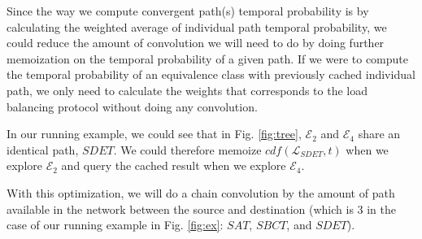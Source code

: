 Since the way we compute convergent path(s) temporal probability is by calculating the weighted average of 
individual path temporal probability, we could reduce the amount of convolution we will need to do by doing further memoization 
on the temporal probability of a given path.
If we were to compute the temporal probability of an equivalence class with previously cached individual 
path, we only need to calculate the weights that corresponds to the load balancing protocol without 
doing any convolution.

In our running example, we could see that in Fig. \ref{fig:tree}, $\mathcal{E}_2$ and $\mathcal{E}_4$ share 
an identical path, $SDET$.
We could therefore memoize $cdf(\mathcal{L}_{SDET}, t)$ when we explore $\mathcal{E}_2$ and query the 
cached result when we explore $\mathcal{E}_4$.

With this optimization, we will do a chain convolution by the amount of path available in the network between 
the source and destination (which is 3 in the case of our running example in Fig. \ref{fig:ex}: $SAT$, $SBCT$, 
and $SDET$).





